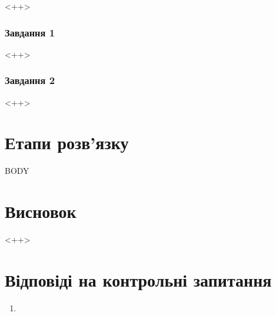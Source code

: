 
%

\newcommand\Variant{VARIANT}
\newcommand\Date{DAY.MONTH.\the\year}
\newcommand\Discipline{DISCIPLINE}
\newcommand\Reviser{INSTRUCTOR}

\newcommand\Lab{лабораторної роботи}
\newcommand\Pract{практичної роботи}
\newcommand\Work{\WORK~\NoNUMBER}
\newcommand\Topic{TOPIC}


\Margins



<++>

\subsubsection*{Завдання 1}

<++>

\subsubsection*{Завдання 2}

<++>

\section*{Етапи розв'язку}

BODY

\section*{Висновок}

<++>

\section*{Відповіді на контрольні запитання}
\begin{enumerate}
\item <++>
\end{enumerate}


